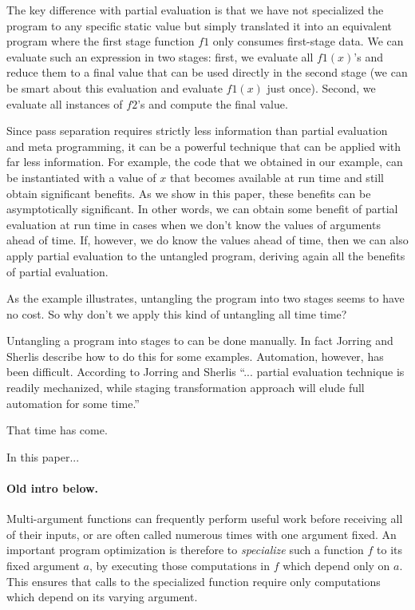 %
The key difference with partial evaluation is that we have not
specialized the program to any specific static value but simply
translated it into an equivalent program where the first stage
function $f1$ only consumes first-stage data.  We can evaluate such an
expression in two stages: first, we evaluate all $f1(x)$'s and reduce
them to a final value that can be used directly in the second stage
(we can be smart about this evaluation and evaluate $f1(x)$ just
once). Second, we evaluate all instances of $f2$'s and compute the
final value.

Since pass separation requires strictly less information than partial
evaluation and meta programming, it can be a powerful technique that
can be applied with far less information.  For example, the code that
we obtained in our example, can be instantiated with a value of $x$
that becomes available at run time and still obtain significant
benefits.  As we show in this paper, these benefits can be
asymptotically significant.  In other words, we can obtain some
benefit of partial evaluation at run time in cases when we don't know
the values of arguments ahead of time.  If, however, we do know the
values ahead of time, then we can also apply partial evaluation to the
untangled program, deriving again all the benefits of partial
evaluation.

As the example illustrates, untangling the program into two stages
seems to have no cost.  So why don't we apply this kind of untangling
all time time?

\smallskip

Untangling a program into stages to can be done manually.  In fact
Jorring and Sherlis describe how to do this for some examples.
Automation, however, has been difficult.  According to Jorring and
Sherlis ``... partial evaluation technique is readily mechanized,
while staging transformation approach will elude full automation for
some time.''  

\smallskip

That time has come.

In this paper...





\paragraph{Old intro below.}

Multi-argument functions can frequently perform useful work before receiving all
of their inputs, or are often called numerous times with one argument fixed. An
important program optimization is therefore to \emph{specialize} such a function
$f$ to its fixed argument $a$, by executing those computations in $f$ which
depend only on $a$. This ensures that calls to the specialized function require
only computations which depend on its varying argument.

